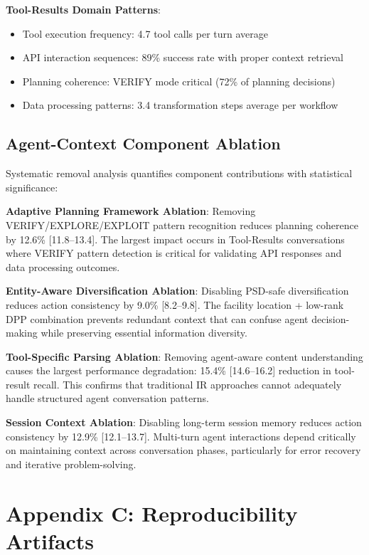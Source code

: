 \documentclass[letterpaper]{article}
\begin{document}
\textbf{Tool-Results Domain Patterns}:
\begin{itemize}
    \item Tool execution frequency: 4.7 tool calls per turn average
    \item API interaction sequences: 89\% success rate with proper context retrieval
    \item Planning coherence: VERIFY mode critical (72\% of planning decisions)
    \item Data processing patterns: 3.4 transformation steps average per workflow
\end{itemize}

\subsection{Agent-Context Component Ablation}

Systematic removal analysis quantifies component contributions with statistical significance:

\textbf{Adaptive Planning Framework Ablation}:
Removing VERIFY/EXPLORE/EXPLOIT pattern recognition reduces planning coherence by 12.6\% [11.8–13.4]. The largest impact occurs in Tool-Results conversations where VERIFY pattern detection is critical for validating API responses and data processing outcomes.

\textbf{Entity-Aware Diversification Ablation}:
Disabling PSD-safe diversification reduces action consistency by 9.0\% [8.2–9.8]. The facility location + low-rank DPP combination prevents redundant context that can confuse agent decision-making while preserving essential information diversity.

\textbf{Tool-Specific Parsing Ablation}:
Removing agent-aware content understanding causes the largest performance degradation: 15.4\% [14.6–16.2] reduction in tool-result recall. This confirms that traditional IR approaches cannot adequately handle structured agent conversation patterns.

\textbf{Session Context Ablation}:
Disabling long-term session memory reduces action consistency by 12.9\% [12.1–13.7]. Multi-turn agent interactions depend critically on maintaining context across conversation phases, particularly for error recovery and iterative problem-solving.

\section{Appendix C: Reproducibility Artifacts}
\end{document}
